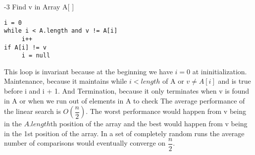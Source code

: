 \documentclass[12pt,largemargins]{homework}
\begin{document}
-3
Find v in Array A[ ]

\begin{verbatim}
i = 0
while i < A.length and v != A[i]
     i++
if A[i] != v
     i = null
\end{verbatim}
This loop is invariant because at the beginning we have $i = 0$ at ininitialization. Maintenance, because it maintains while $i < length$ of A or $v \neq A[i]$ and is true before i and i + 1. And Termination, because it only terminates when v is found in A or when we run out of elements in A to check
\question
The average performance of the linear search is $O(\dfrac{n}{2})$. The worst performance would happen from v being in the $A.length$th position of the array and the best would happen from v being in the 1st position of the array. In a set of completely random runs the average number of comparisons would eventually converge on $\dfrac{n}{2}$.
\end{document}
